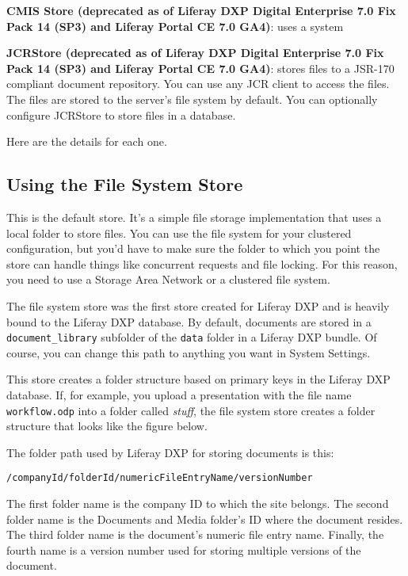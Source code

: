 \textbf{CMIS Store (deprecated as of Liferay DXP Digital Enterprise 7.0
Fix Pack 14 (SP3) and Liferay Portal CE 7.0 GA4)}: uses a system

\textbf{JCRStore (deprecated as of Liferay DXP Digital Enterprise 7.0
Fix Pack 14 (SP3) and Liferay Portal CE 7.0 GA4)}: stores files to a
JSR-170 compliant document repository. You can use any JCR client to
access the files. The files are stored to the server's file system by
default. You can optionally configure JCRStore to store files in a
database.

Here are the details for each one.

\subsection{Using the File System
Store}\label{using-the-file-system-store}

This is the default store. It's a simple file storage implementation
that uses a local folder to store files. You can use the file system for
your clustered configuration, but you'd have to make sure the folder to
which you point the store can handle things like concurrent requests and
file locking. For this reason, you need to use a Storage Area Network or
a clustered file system.

The file system store was the first store created for Liferay DXP and is
heavily bound to the Liferay DXP database. By default, documents are
stored in a \texttt{document\_library} subfolder of the \texttt{data}
folder in a Liferay DXP bundle. Of course, you can change this path to
anything you want in System Settings.

This store creates a folder structure based on primary keys in the
Liferay DXP database. If, for example, you upload a presentation with
the file name \texttt{workflow.odp} into a folder called \emph{stuff},
the file system store creates a folder structure that looks like the
figure below.

The folder path used by Liferay DXP for storing documents is this:

\begin{verbatim}
/companyId/folderId/numericFileEntryName/versionNumber
\end{verbatim}

The first folder name is the company ID to which the site belongs. The
second folder name is the Documents and Media folder's ID where the
document resides. The third folder name is the document's numeric file
entry name. Finally, the fourth name is a version number used for
storing multiple versions of the document.

